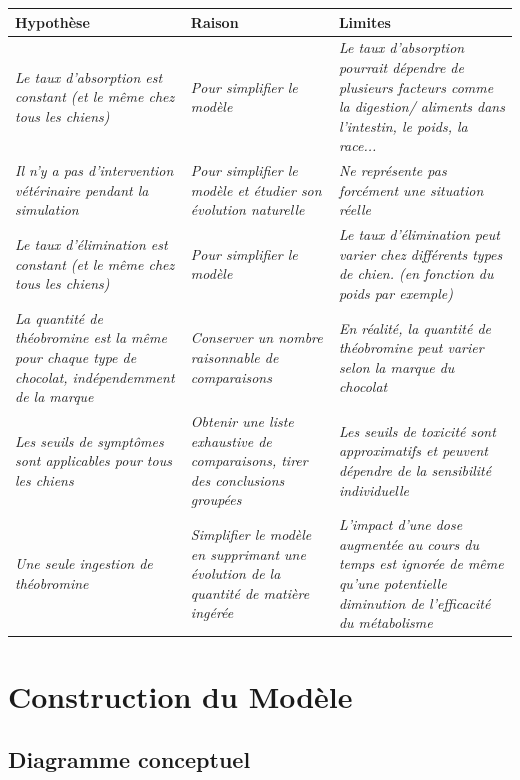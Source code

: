 \documentclass[11pt,a4paper]{article}
\begin{document}
\begin{center}
\begin{tabular}{p{5cm}p{5cm}p{4cm}}
\toprule
\textbf{Hypothèse} & \textbf{Raison} & \textbf{Limites} \\
\midrule
\emph{Le taux d'absorption est constant (et le même chez tous les chiens)} 
& \emph{Pour simplifier le modèle} 
& \emph{Le taux d'absorption pourrait dépendre de plusieurs facteurs 
comme la digestion/ aliments dans l'intestin, le poids, la race...} \\
\emph{Il n'y a pas d'intervention vétérinaire pendant la simulation} 
& \emph{Pour simplifier le modèle et étudier son évolution naturelle} 
& \emph{Ne représente pas forcément une situation réelle} \\
\emph{Le taux d'élimination est constant (et le même chez tous les chiens)} 
& \emph{Pour simplifier le modèle} 
& \emph{Le taux d'élimination peut varier chez différents types de chien. (en fonction du poids par exemple)} \\
\emph{La quantité de théobromine est la même pour chaque type de chocolat, indépendemment de la marque} 
& \emph{Conserver un nombre raisonnable de comparaisons} 
& \emph{En réalité, la quantité de théobromine peut varier selon la marque du chocolat} \\
\emph{Les seuils de symptômes sont applicables pour tous les chiens} 
& \emph{Obtenir une liste exhaustive de comparaisons, tirer des conclusions groupées} 
& \emph{Les seuils de toxicité sont approximatifs et peuvent dépendre de la sensibilité individuelle} \\
\emph{Une seule ingestion de théobromine } 
& \emph{Simplifier le modèle en supprimant une évolution de la quantité de matière ingérée} 
& \emph{L'impact d'une dose augmentée au cours du temps est ignorée de même qu'une potentielle diminution de l'efficacité du métabolisme } \\
\bottomrule
\end{tabular}
\end{center}
\section{Construction du Modèle}
\label{sec:model}

\subsection{Diagramme conceptuel}
\end{document}
